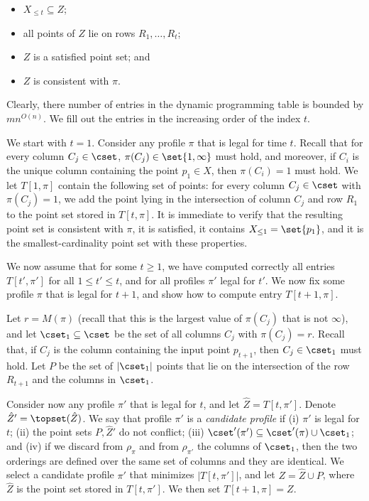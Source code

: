 \documentclass{toc}
\begin{document}
\begin{itemize}
	\item $X_{\leq t}\subseteq Z$;
	\item all points of $Z$ lie on rows $R_1,\ldots, R_t$;
\item 	$Z$ is a satisfied point set; and 
\item $Z$ is consistent with $\pi$.
\end{itemize}



Clearly, there number of entries in the dynamic programming table is bounded by $m n^{O(n)}$. We fill out the entries in the increasing order of the index $t$.  

We start with $t=1$. Consider any profile $\pi$ that is legal for time $t$. Recall that for every column $C_j\in \cset$, $\pi(C_j)\in \set{1,\infty}$ must hold, and moreover, if $C_i$ is the unique column containing the point $p_1\in X$, then $\pi(C_i)=1$ must hold.
We let $T[1,\pi]$ contain the following set of points: for every column $C_j\in \cset$ with $\pi(C_j)=1$, we add the point lying in the intersection of column $C_j$ and row $R_1$ to the point set stored in $T[t,\pi]$. It is immediate to verify that the resulting point set is consistent with $\pi$, it is satisfied, it contains $X_{\leq 1}=\set{p_1}$, and it is the smallest-cardinality point set with these properties.

We now assume that for some $t\geq 1$, we have computed correctly all entries $T[t',\pi']$ for all $1\leq t'\leq t$, and for all profiles $\pi'$ legal for $t'$. We now fix some profile $\pi$ that is legal for $t+1$, and show how to compute entry $T[t+1,\pi]$.

Let $r=M(\pi)$ (recall that this is the largest value of $\pi(C_j)$ that is not $\infty$), and let $\cset_1\subseteq \cset$ be the set of all columns $C_j$ with $\pi(C_j)=r$. Recall that, if $C_j$ is the column containing the input point $p_{t+1}$, then $C_j\in \cset_1$ must hold. Let $P$ be the set of $|\cset_1|$ points that lie on the intersection of the row $R_{t+1}$ and the columns in $\cset_1$.

Consider now any profile $\pi'$ that is legal for $t$, and let $\hat Z=T[t,\pi']$. Denote $\hat Z'=\topset(\hat Z)$. We say that profile $\pi'$ is a \emph{candidate profile} if (i) $\pi'$ is legal for $t$; (ii) the point sets $P,\hat Z'$ do not conflict; (iii) $\cset'(\pi')\subseteq \cset'(\pi)\cup \cset_1$; and (iv) if we discard from $\rho_{\pi}$ and from $\rho_{\pi'}$ the columns of $\cset_1$, then the two orderings are defined over the same set of columns and they are identical. We select a candidate profile $\pi'$ that minimizes $|T[t,\pi']|$, and let $Z=\hat Z\cup P$, where $\hat Z$ is the point set stored in $T[t,\pi']$. We then set $T[t+1,\pi]=Z$.
\end{document}
